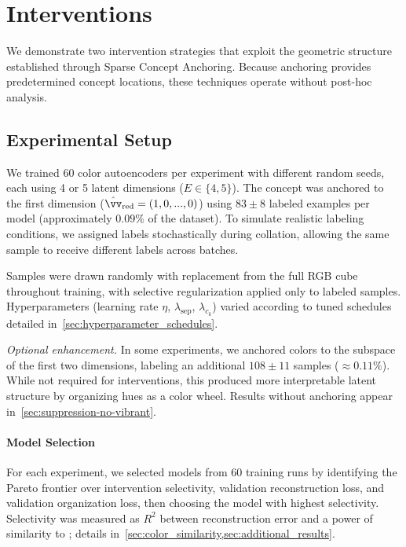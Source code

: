 \section{Interventions}
\label{sec:interventions}

We demonstrate two intervention strategies that exploit the geometric structure established through Sparse Concept Anchoring. Because anchoring provides predetermined concept locations, these techniques operate without post-hoc analysis.

\subsection{Experimental Setup}
\label{sec:experimental_setup}

We trained 60 color autoencoders per experiment with different random seeds, each using 4 or 5 latent dimensions ($E \in \{4,5\}$). The  concept was anchored to the first dimension ($\hat{\vv}_{\text{red}}=(1,0,...,0)$) using $83 \pm 8$ labeled examples per model (approximately $0.09\%$ of the dataset). To simulate realistic labeling conditions, we assigned labels stochastically during collation, allowing the same sample to receive different labels across batches.

Samples were drawn randomly with replacement from the full RGB cube throughout training, with selective regularization applied only to labeled samples. Hyperparameters (learning rate $\eta$, $\lambda_{\text{sep}}$, $\lambda_{c_k}$) varied according to tuned schedules detailed in~\cref{sec:hyperparameter_schedules}.

\textit{Optional enhancement.} In some experiments, we anchored  colors to the subspace of the first two dimensions, labeling an additional $108 \pm 11$ samples ($\approx 0.11\%$). While not required for  interventions, this produced more interpretable latent structure by organizing hues as a color wheel. Results without  anchoring appear in~\cref{sec:suppression-no-vibrant}.

\paragraph{Model Selection} For each experiment, we selected models from 60 training runs by identifying the Pareto frontier over intervention selectivity, validation reconstruction loss, and validation organization loss, then choosing the model with highest selectivity. Selectivity was measured as $R^2$ between reconstruction error and a power of similarity to ; details in~\cref{sec:color_similarity,sec:additional_results}.

